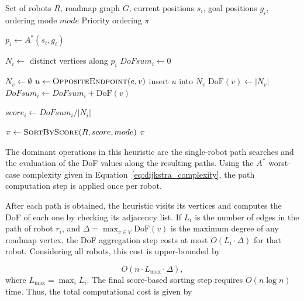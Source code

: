 \begin{algorithm}[H]
\caption{Average DoF Path Heuristic}
\label{alg:average_dof}
\footnotesize
\begin{algorithmic}[1]
\Require Set of robots $R$, roadmap graph $G$, current positions $s_i$, goal positions $g_i$, ordering mode $mode$
\Ensure Priority ordering $\pi$

    \State $p_i \gets A^*(s_i, g_i)$  

    \State $N_i \gets$ distinct vertices along $p_i$
    \State $DoFsum_i \gets 0$

        \State $N_v \gets \emptyset$ 
            \State $u \gets \textsc{OppositeEndpoint}(e, v)$ 
            \State insert $u$ into $N_v$
        \EndFor
        \State $\mathrm{DoF}(v) \gets |N_v|$ 
        \State $DoFsum_i \gets DoFsum_i + \mathrm{DoF}(v)$
    \EndFor

    \State $score_i \gets DoFsum_i / |N_i|$
\EndFor

\State $\pi \gets \textsc{SortByScore}(R, score, mode)$
\State \Return $\pi$
\end{algorithmic}
\end{algorithm}


The dominant operations in this heuristic are the single-robot path searches and the evaluation of the DoF values along the resulting paths. Using the \(A^*\) worst-case complexity given in Equation~\ref{eq:dijkstra_complexity}, the path computation step is applied once per robot.

After each path is obtained, the heuristic visits its vertices and computes the DoF of each one by checking its adjacency list. If \(L_i\) is the number of edges in the path of robot \(r_i\), and \(\Delta = \max_{v \in V} \mathrm{DoF}(v)\) is the maximum degree of any roadmap vertex, the DoF aggregation step costs at most \(O(L_i \cdot \Delta)\) for that robot. Considering all robots, this cost is upper-bounded by

\begin{equation}
    O(n \cdot L_{\max} \cdot \Delta),
\end{equation}
where \(L_{\max} = \max_i L_i\). The final score-based sorting step requires \(O(n \log n)\) time. Thus, the total computational cost is given by

